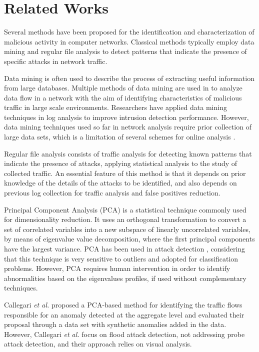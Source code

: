 \section{Related Works}
\label{sec:2_relatedworks}

Several methods have been proposed for the identification and characterization of malicious activity in computer networks. Classical methods typically employ data mining \cite{he2008applying,ghourabi2010data,osanaiye2016distributed} and regular file analysis \cite{raynal2004honeypot} to detect patterns that indicate the presence of specific attacks in network traffic.

Data mining is often used to describe the process of extracting useful information from large databases. Multiple methods of data mining are used in \cite{he2008applying,osanaiye2016distributed} to analyze data flow in a network with the aim of identifying characteristics of malicious traffic in large scale environments. Researchers have applied data mining techniques in log analysis \cite{ghourabi2010data} to improve intrusion detection performance. However, data mining techniques used so far in network analysis require prior collection of large data sets, which is a limitation of several schemes for online analysis \cite{he2008applying}.

Regular file analysis \cite{raynal2004honeypot} consists of traffic analysis for detecting known patterns that indicate the presence of attacks, applying statistical analysis to the study of collected traffic. An essential feature of this method is that it depends on prior knowledge of the details of the attacks to be identified, and also depends on previous log collection for traffic analysis and false positives reduction.

Principal Component Analysis (PCA) is a statistical technique commonly used for dimensionality reduction. It uses an orthogonal transformation to convert a set of correlated variables into a new subspace of linearly uncorrelated variables, by means of eigenvalue value decomposition, where the first principal components have the largest variance. PCA has been used in attack detection \cite{almotairi2009technique}, considering that this technique is very sensitive to outliers and adopted for classification problems. However, PCA requires human intervention in order to identify abnormalities based on the eigenvalues profiles, if used without complementary techniques.

Callegari \emph{et al.} \cite{callegari2011novel} proposed a PCA-based method for identifying the traffic flows responsible for an anomaly detected at the aggregate level and evaluated their proposal through a data set with synthetic anomalies added in the data. However, Callegari \emph{et al.} \cite{callegari2011novel} focus on flood attack detection, not addressing probe attack detection, and their approach relies on visual analysis. 

